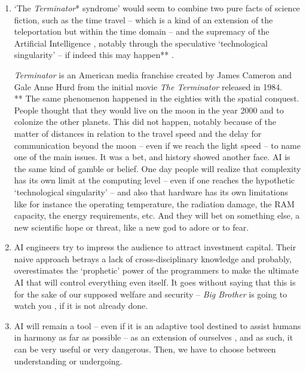 \documentclass{article}
\begin{document}
\begin{enumerate}[leftmargin=*,label=\underline{\textit{Statement} \arabic*} :]
\itemsep0.9em 
\item `The \textit{Terminator}*
syndrome' would seem to combine two pure facts of science fiction, such as the time travel -- which is a kind of an extension of the teleportation but within the time domain -- and the supremacy of the Artificial Intelligence%
, notably through the speculative `technological singularity' 
-- if indeed this may happen**
 \citep{dam}. 
\begin{spacing}{0.8}
{\footnotesize * \textit{Terminator} is an American media franchise created by James Cameron and Gale Anne Hurd from the initial movie \textit{The Terminator} released in 1984. \\ ** The same phenomenon happened in the eighties with the spatial conquest. People thought that they would live on the moon in the year 2000 and to colonize the other planets. This did not happen, notably because of the matter of distances in relation to the travel speed and the delay for communication beyond the moon -- even if we reach the light speed -- to name one of the main issues. It was a bet, and history showed another face. 
AI is the same kind of gamble or belief. One day people will realize that complexity has its own limit at the computing level --  even if one reaches the hypothetic `technological singularity' -- and also that hardware has its own limitations like for instance the operating temperature, the radiation damage, the RAM capacity, the energy requirements, etc. And they will bet on something else, a new scientific hope or threat, like a new god to adore or to fear. 
}%
\end{spacing}
\vspace{1mm}
\item AI engineers try to impress the audience to attract investment capital. 
Their naive approach betrays a lack of cross-disciplinary knowledge and probably, 
overestimates the `prophetic' power of the programmers to make the ultimate AI that will control everything even itself. It goes without saying that this is for the sake of our supposed welfare and security -- \textit{Big Brother} is going to watch you \citep{bbgo}, if it is not already done.
\item AI will remain a tool  -- even if it is an adaptive tool destined to assist humans in harmony as far as possible  -- as an extension of ourselves \citep{mm}, and as such, it can be very useful or very dangerous. Then, we have to choose between understanding or undergoing.

\end{enumerate}
\end{document}
